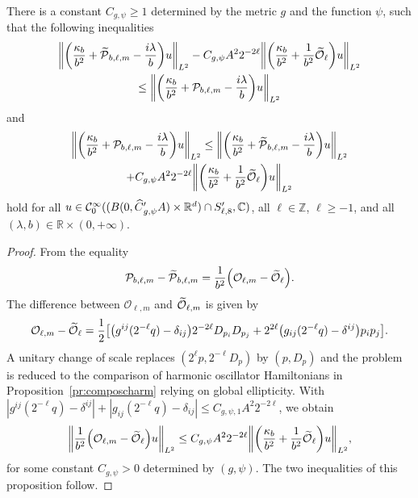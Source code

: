 \documentclass[10pt]{amsart}
\theoremstyle{definition}\newtheorem{defi}[theo]{Definition}\newtheorem{rema}[theo]{Remark}\newtheorem{exam}[theo]{Example}\newtheorem{exem}[theo]{Example}\newtheorem{nota}[theo]{Notation}
\newcommand{\C}{\mathbb{C}}
\newcommand{\Z}{\mathbb{Z}}
\newcommand{\R}{\mathbb{R}}
\newcommand{\clC}{\mathcal{C}}
\newcommand{\clO}{\mathcal{O}}
\newcommand{\clP}{\mathcal{P}}
\let\oldtilde\tilde
\renewcommand*{\tilde}[1]{\mathchoice{\widetilde{#1}}{\widetilde{#1}}{\oldtilde{#1}}{\oldtilde{#1}}}
\let\oldhat\hat
\renewcommand*{\hat}[1]{\mathchoice{\widehat{#1}}{\widehat{#1}}{\oldhat{#1}}{\oldhat{#1}}}
\let\originalleft\left
\let\originalright\right
\renewcommand{\left}{\mathopen{}\mathclose\bgroup\originalleft}
\renewcommand{\right}{\aftergroup\egroup\originalright}
\begin{document}
\begin{prop}\label{pr:ChangingOToTheEuclideanO}
There is a constant $C_{g,\psi}\geq 1$ determined by the metric $g$ and the function $\psi$, such that the following inequalities
\begin{multline*}
\left\| \left(
\frac{\kappa_{b}}{b^{2}} + \tilde{\clP}_{b,\ell,m} - \frac{i\lambda}{b}
\right) u \right\|_{L^2} - C_{g,\psi} A^{2}2^{-2\ell}\left\|\left(
\frac{\kappa_{b}}{b^{2}} + \frac{1}{b^{2}}\tilde{\clO}_{\ell}
\right) u \right\|_{L^2}
\\
\leq
\left\| \left(
\frac{\kappa_{b}}{b^{2}} + \clP_{b,\ell,m}-\frac{i\lambda}{b}
\right) u\right\|_{L^2}
\end{multline*}
and
\begin{multline*}
\left\|\left(
\frac{\kappa_{b}}{b^{2}} + \clP_{b,\ell,m}-\frac{i\lambda}{b}
\right) u\right\|_{L^2}
\leq
\left\|\left(
\frac{\kappa_{b}}{b^{2}} + \tilde{\clP}_{b,\ell,m} - \frac{i\lambda}{b}
\right) u \right\|_{L^2}
\\
+ C_{g,\psi} A^{2}2^{-2\ell}
\left\|\left(
\frac{\kappa_{b}}{b^{2}} + \frac{1}{b^{2}}\tilde{\clO}_{\ell}
\right) u \right\|_{L^2}
\end{multline*}
hold for all $u\in \clC^\infty_0((B(0,\hat{C}'_{g,\psi}A)\times \R^d)\cap S_{\ell,8}',\C)$, all $\ell\in\Z$, $\ell\geq -1$, and all $(\lambda,b)\in \R\times (0,+\infty)$.
\end{prop}

\begin{proof}
From the equality
\begin{equation}
\clP_{b,\ell,m} - \tilde{\clP}_{b,\ell,m} = \frac{1}{b^{2}}
\left(
\clO_{\ell,m} - \tilde{\clO}_{\ell}
\right).
\end{equation}
The difference between $\clO_{\ell,m}$ and $\tilde{\clO}_{\ell,m}$ is given by
\begin{equation}
\clO_{\ell,m}- \tilde{\clO}_{\ell} = \frac{1}{2}
\left[
\left(g^{ij}(2^{-\ell}q)-\delta_{ij}
\right)2^{-2\ell}D_{p_{i}}D_{p_{j}} +2^{2\ell}
\left(g_{ij}(2^{-\ell}q)-\delta^{ij} \right)p_{i}p_{j}
\right].
\end{equation}
A unitary change of scale replaces $(2^\ell p, 2^{-\ell} D_p)$ by $(p,D_p)$ and the problem is reduced to the comparison of harmonic oscillator Hamiltonians in Proposition~\ref{pr:composcharm} relying on global ellipticity. With $|g^{ij}(2^{-\ell}q)-\delta^{ij}|+|g_{ij}(2^{-\ell}q)-\delta_{ij}|\leq C_{g,\psi,1}A^2 2^{-2\ell}$, we obtain
\begin{equation}\label{eq:upperBoundForReplacingOToTheEuclideanO}
\left\| \frac{1}{b^{2}}
\left(
\clO_{\ell,m} - \tilde{\clO}_{\ell}
\right) u \right\|_{L^2} \leq C_{g,\psi} A^{2}2^{-2\ell} \left\|
\left(
\frac{\kappa_{b}}{b^{2}} + \frac{1}{b^{2}}\tilde{\clO}_{\ell}
\right) u \right\|_{L^2},
\end{equation}
for some constant $C_{g,\psi}>0$ determined by $(g,\psi)$. The two inequalities of this proposition follow.
\end{proof}
\end{document}
